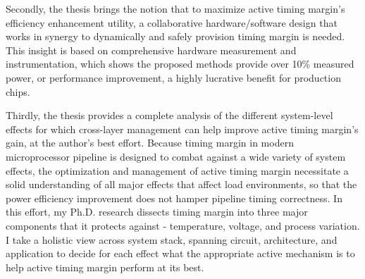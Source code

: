Secondly, the thesis brings the notion that to maximize active timing margin's efficiency enhancement utility, a collaborative hardware/software design that works in synergy to dynamically and safely provision timing margin is needed. This insight is based on comprehensive hardware measurement and instrumentation, which shows the proposed methods provide over 10\% measured power, or performance improvement, a highly lucrative benefit for production chips.

Thirdly, the thesis provides a complete analysis of the different system-level effects for which cross-layer management can help improve active timing margin's gain, at the author's best effort. Because timing margin in modern microprocessor pipeline is designed to combat against a wide variety of system effects, the optimization and management of active timing margin necessitate a solid understanding of all major effects that affect load environments, so that the power efficiency improvement does not hamper pipeline timing correctness. In this effort, my Ph.D. research dissects timing margin into three major components that it protects against - temperature, voltage, and process variation. I take a holistic view across system stack, spanning circuit, architecture, and application to decide for each effect what the appropriate active mechanism is to help active timing margin perform at its best.

